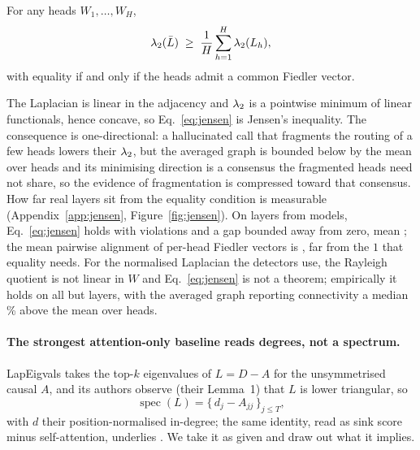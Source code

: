 \begin{proposition}
\label{prop:jensen}
For any heads $W_1,\dots,W_H$,
\begin{equation}
\lambda_{2}(\bar L)\;\ge\;\frac1H\sum_{h=1}^{H}\lambda_{2}(L_h),
\label{eq:jensen}
\end{equation}
with equality if and only if the heads admit a common Fiedler vector.
\end{proposition}
\label{sec:theory:jensen}

The Laplacian is linear in the adjacency and $\lambda_{2}$ is a pointwise minimum of linear functionals, hence
concave, so Eq.~\ref{eq:jensen} is Jensen's inequality. The consequence is one-directional: a hallucinated
call that fragments the routing of a few heads lowers their $\lambda_{2}$, but the averaged graph is bounded
below by the mean over heads and its minimising direction is a consensus the fragmented heads need not share,
so the evidence of fragmentation is compressed toward that consensus. How far real layers sit from the
equality condition is measurable (Appendix~\ref{app:jensen}, Figure~\ref{fig:jensen}). On
\nJensenLayers{} layers from \nJensenModels{} models, Eq.~\ref{eq:jensen} holds with \combGapViolations{}
violations and a gap bounded away from zero, mean \combGapMean{}; the mean pairwise alignment of per-head
Fiedler vectors is \fiedlerAlignmentMean{}, far from the $1$ that equality needs. For the normalised
Laplacian the detectors use, the Rayleigh quotient is not linear in $W$ and Eq.~\ref{eq:jensen} is not a
theorem; empirically it holds on all but \normGapViolations{} layers, with the averaged graph reporting
connectivity a median \normRatioMedianPct{}\% above the mean over heads.

\paragraph{The strongest attention-only baseline reads degrees, not a spectrum.}
\label{sec:theory:lapeig}
LapEigvals \citep{binkowski2025lapeigvals} takes the top-$k$ eigenvalues of $L=D-A$ for the unsymmetrised
causal $A$, and its authors observe (their Lemma~1) that $L$ is lower triangular, so
\begin{equation}
\operatorname{spec}(L)=\{\,d_j-A_{jj}\,\}_{j\le T},
\label{eq:lapeigdiag}
\end{equation}
with $d$ their position-normalised in-degree; the same identity, read as sink score minus self-attention,
underlies \citet{binkowski2026sinks}. We take it as given and draw out what it implies.

